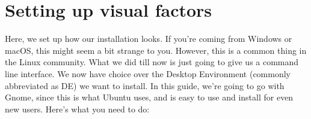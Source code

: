 \documentclass{article}
\begin{document}
\section{Setting up visual factors}
Here, we set up how our installation looks. If you're coming from Windows or macOS, this might seem a bit strange to you. However, this is a common thing in the Linux community. What we did till now is just going to give us a command line interface. We now have choice over the Desktop Environment (commonly abbreviated as DE) we want to install. In this guide, we're going to go with Gnome, since this is what Ubuntu uses, and is easy to use and install for even new users. Here's what you need to do:
\end{document}
